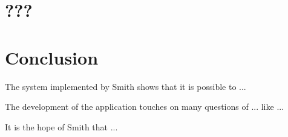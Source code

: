 \documentclass[runningheads]{llncs}
\newcommand{\authorquote}{Smith \etal}
\begin{document}
\section{???}


\section{Conclusion} \label{sec:conclusion}

The system implemented by \authorquote{} shows that it is possible to ...

The development of the application touches on many questions of ... like ...

It is the hope of \authorquote{} that ...


\begin{comment}
\section{Notes}


\end{comment}
\end{document}
